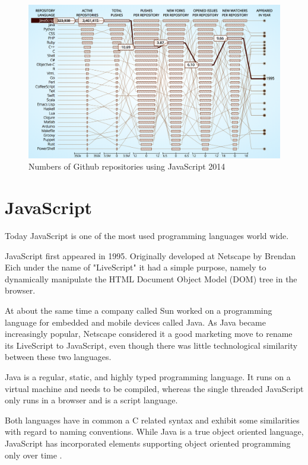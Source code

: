 \begin{figure}[ht]
	\centering
	\includegraphics[width=\linewidth]{bilder/grundlagen/jsUsage.png}
	\caption{Numbers of Github repositories using JavaScript 2014 \cite{GitHut}} 
	\label{fig:JSgithub}
\end{figure}

\section{JavaScript}
Today JavaScript is one of the most used programming languages world wide.

JavaScript first appeared in 1995. Originally developed at Netscape
by Brendan Eich under the name of "LiveScript" it had a simple purpose, namely to dynamically manipulate the HTML Document Object Model (DOM) tree in the browser. 
 
At about the same time a company called Sun worked on a programming
language for embedded and mobile devices called Java.   
As Java became increasingly popular,
Netscape considered it a good marketing move to rename its
LiveScript to JavaScript, even though there was little technological
similarity between these two languages.
    
Java is a regular, static, and highly typed programming language.
It runs on a virtual machine and needs to be compiled, whereas the
single threaded JavaScript only runs in a browser and is a script
language. 
  
Both languages have in common a C related syntax and exhibit some 
similarities with regard to naming conventions. While Java is a true
object oriented language, JavaScript has incorporated elements
supporting object oriented programming only over time \cite{Bewersdorff2018ObjektorientierteProgrammierung}. 
  
